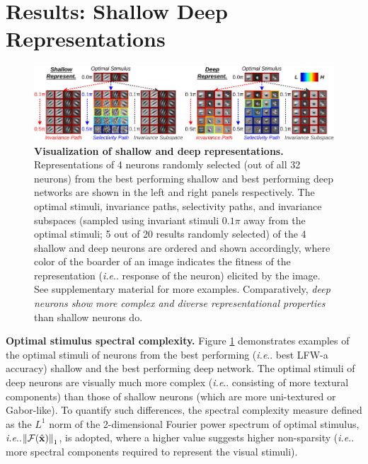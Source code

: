 \documentclass[fleqn]{article} %
\makeatletter
\DeclareRobustCommand\onedot{\futurelet\@let@token\@onedot}
\def\@onedot{\ifx\@let@token.\else.\null\fi\xspace}
\def\ie{\emph{i.e}\onedot} \def\Ie{\emph{I.e}\onedot}
\makeatother
\begin{document}
\section{Results: Shallow \vs Deep Representations}
\label{sec:results1}

\begin{figure}[t]
\centering \includegraphics[width=\textwidth]{Figs/s_vs_d_repr.pdf} 
\caption{{\bf Visualization of shallow and deep representations.} %
Representations of 4 neurons randomly selected (out of all 32 neurons) from the best performing shallow and best performing deep networks are shown in the left and right panels respectively. 
The optimal stimuli, invariance paths, selectivity paths, and invariance subspaces (sampled using invariant stimuli $0.1\pi$ away from the optimal stimuli; 5 out of 20 results randomly selected) of the 4 shallow and deep neurons are ordered and shown accordingly, where color of the boarder of an image indicates the fitness of the representation (\ie response of the neuron) elicited by the image.
See supplementary material for more examples.
Comparatively, \emph{deep neurons show more complex and diverse representational properties} than shallow neurons do.
} %
\label{fig:allrep1}
\end{figure}

{\bf Optimal stimulus spectral complexity.}
Figure \ref{fig:allrep1} demonstrates examples of the optimal stimuli of neurons from the best performing (\ie best LFW-a accuracy) shallow and the best performing deep network.
The optimal stimuli of deep neurons are visually much more complex (\ie consisting of more textural components) than those of shallow neurons (which are more uni-textured or Gabor-like).
To quantify such differences, the spectral complexity measure defined as the $L^{1}$ norm of the 2-dimensional Fourier power spectrum of optimal stimulus, \ie $\left\| \mathcal{F}(\hat{\bf{x}}) \right\|_{1}$, is adopted, where a higher value suggests higher non-sparsity (\ie more spectral components required to represent the visual stimuli).

\end{document}
